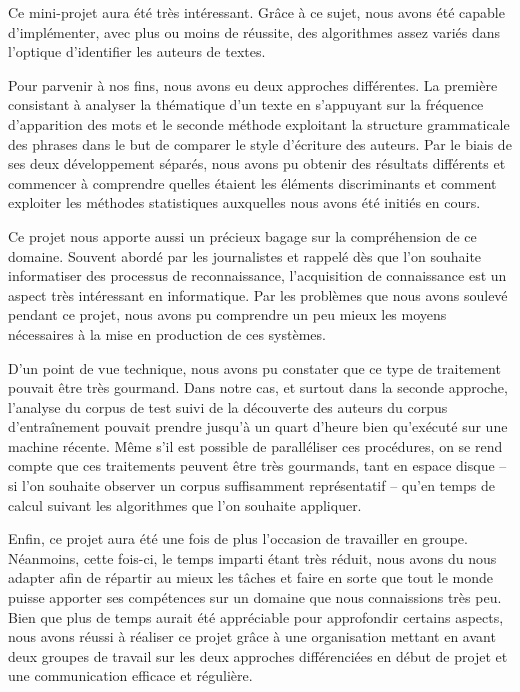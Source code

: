 \documentclass[a4paper,12pt]{report}
\begin{document}
Ce mini-projet aura été très intéressant. Grâce à ce sujet, nous avons été capable d'implémenter, avec plus ou moins de réussite, des algorithmes assez variés dans l'optique d'identifier les auteurs de textes.

Pour parvenir à nos fins, nous avons eu deux approches différentes. La première consistant à analyser la thématique d'un texte en s'appuyant sur la fréquence d'apparition des mots et le seconde méthode exploitant la structure grammaticale des phrases dans le but de comparer le style d'écriture des auteurs. Par le biais de ses deux développement séparés, nous avons pu obtenir des résultats différents et commencer à comprendre quelles étaient les éléments discriminants et comment exploiter les méthodes statistiques auxquelles nous avons été initiés en cours.

Ce projet nous apporte aussi un précieux bagage sur la compréhension de ce domaine. Souvent abordé par les journalistes et rappelé dès que l'on souhaite informatiser des processus de reconnaissance, l'acquisition de connaissance est un aspect très intéressant en informatique. Par les problèmes que nous avons soulevé pendant ce projet, nous avons pu comprendre un peu mieux les moyens nécessaires à la mise en production de ces systèmes.

D'un point de vue technique, nous avons pu constater que ce type de traitement pouvait être très gourmand. Dans notre cas, et surtout dans la seconde approche, l'analyse du corpus de test suivi de la découverte des auteurs du corpus d'entraînement pouvait prendre jusqu'à un quart d'heure bien qu'exécuté sur une machine récente. Même s'il est possible de paralléliser ces procédures, on se rend compte que ces traitements peuvent être très gourmands, tant en espace disque -- si l'on souhaite observer un corpus suffisamment représentatif -- qu'en temps de calcul suivant les algorithmes que l'on souhaite appliquer.

Enfin, ce projet aura été une fois de plus l'occasion de travailler en groupe. Néanmoins, cette fois-ci, le temps imparti étant très réduit, nous avons du nous adapter afin de répartir au mieux les tâches et faire en sorte que tout le monde puisse apporter ses compétences sur un domaine que nous connaissions très peu. Bien que plus de temps aurait été appréciable pour approfondir certains aspects, nous avons réussi à réaliser ce projet grâce à une organisation mettant en avant deux groupes de travail sur les deux approches différenciées en début de projet et une communication efficace et régulière.
\end{document}
